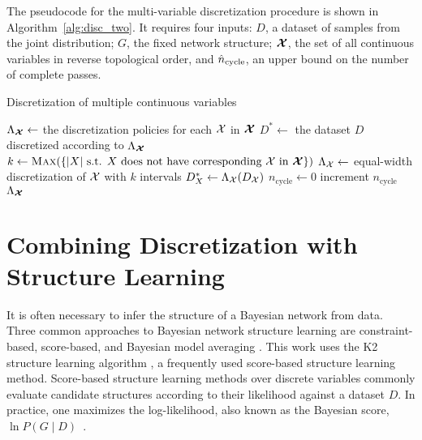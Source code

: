 The pseudocode for the multi-variable discretization procedure is shown in Algorithm~\ref{alg:disc_two}.
It requires four inputs: $D$, a dataset of samples from the joint distribution; $G$, the fixed network structure; $\bm{\mathcal{X}}$, the set of all continuous variables in reverse topological order, and $\hat{n}_\text{cycle}$, an upper bound on the number of complete passes.

\begin{algorithm}
  \caption{Discretization of multiple continuous variables}
  \label{alg:disc_two}
  \begin{algorithmic}[5]
    \State $\Lambda_{\bm{\mathcal{X}}} \leftarrow$ the discretization policies for each $\mathcal{X}$ in $\bm{\mathcal{X}}$
    \State $D^* \leftarrow $ the dataset $D$ discretized according to $\Lambda_{\bm{\mathcal{X}}}$
    \State $k \leftarrow \textsc{Max}\paren{\curly{ |X| \text{ s.t. } X \text{ does not have corresponding } \cX \text{ in } \bm{\cX} }}$
      \State $\Lambda_{\mathcal{X}} \leftarrow$ equal-width discretization of $\mathcal{X}$ with $k$ intervals
      \State $D^*_{X} \leftarrow \Lambda_{\cX} \paren{D_{\cX}}$
    \EndFor
    \State $n_\text{cycle} \leftarrow 0$
      \State increment {$n_\text{cycle}$}
      \EndFor
    \EndWhile
    \State \Return $\Lambda_{\bm{\mathcal{X}}}$
  \EndFunction
  \end{algorithmic}
\end{algorithm}

\section{Combining Discretization with Structure Learning}
\label{sec:structure_learning}

It is often necessary to infer the structure of a Bayesian network from data.
Three common approaches to Bayesian network structure learning are constraint-based, score-based, and Bayesian model averaging \citep[see][chap.~18]{PGM_2009}.
This work uses the K2 structure learning algorithm \citep{cooper1992bayesian}, a frequently used score-based structure learning method.
Score-based structure learning methods over discrete variables commonly evaluate candidate structures according to their likelihood against a dataset $D$.
In practice, one maximizes the log-likelihood, also known as the Bayesian score, $\ln P(G\mid D)$~\citep{cooper1992bayesian}.

